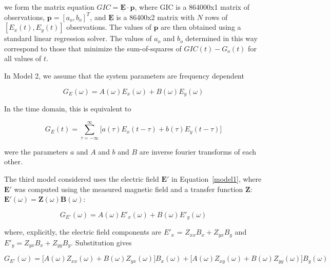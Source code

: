 \documentclass[draft,linenumbers]{agujournal2018}
\begin{document}
\noindent
we form the matrix equation $GIC = \underline{\mathbf{E}}\cdot\mathbf{p}$, where GIC is a 864000x1 matrix of observations, $\mathbf{p} = [a_o,b_o]^T$, and $\underline{\mathbf{E}}$ is a 86400x2 matrix with $N$ rows of $[E_x(t), E_y(t)]$ observations. The values of $\mathbf{p}$ are then obtained using a standard linear regression solver. The values of $a_o$ and $b_o$ determined in this way correspond to those that minimize the sum-of-squares of $GIC(t)-G_o(t)$ for all values of $t$. \citep[][ provided the mathematically equivalent closed-form equations.]{Pulkkinen2007}

In Model 2, we assume that the system parameters are frequency dependent

\begin{linenomath*}
\begin{equation}
G_E(\omega) = A(\omega)E_x(\omega) + B(\omega)E_y(\omega)
\label{model2}
\tag{2a}
\end{equation}
\end{linenomath*}

\noindent
In the time domain, this is equivalent to

\begin{linenomath*}
\begin{equation}
G_E(t) = \sum_{\tau=-\infty}^{\infty}\big[a(\tau)E_x(t-\tau) + b(\tau)E_y(t-\tau)\big]
\label{model2b}
\tag{2b}
\end{equation}
\end{linenomath*}

\noindent
were the parameters $a$ and $A$ and $b$ and $B$ are inverse fourier transforms of each other.

The third model considered uses the electric field $\mathbf{E}'$ in Equation~\ref{model1}, where $\mathbf{E}'$ was computed using the measured magnetic field and a transfer function $\mathbf{Z}$: $\mathbf{E}'(\omega) = \mathbf{Z}(\omega)\mathbf{B}(\omega)$:

\setcounter{equation}{2}
\begin{linenomath*}
\begin{equation}
G_{E'}(\omega) = A(\omega)E'_x(\omega) + B(\omega)E'_y(\omega)
\end{equation}
\end{linenomath*}

\noindent
where, explicitly, the electric field components are $E'_x$ = $Z_{xx}B_x + Z_{yx}B_y$ and $E'_y = Z_{yx}B_x + Z_{yy}B_y$. Substitution gives

\begin{equation*}
G_{E'}(\omega) = \big[A(\omega)Z_{xx}(\omega) + B(\omega)Z_{yx}(\omega) \big] B_x(\omega) + \big[ A(\omega)Z_{xy}(\omega) + B(\omega)Z_{yy}(\omega) \big] B_y(\omega)
\end{equation*}
\end{document}
